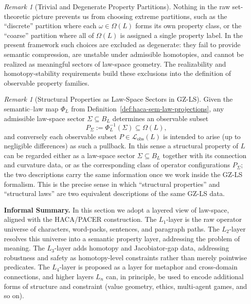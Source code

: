 \documentclass[11pt]{book}
\theoremstyle{plain}
\theoremstyle{definition}
\theoremstyle{remark}
\newtheorem{remark}[theorem]{Remark}
\begin{document}
\begin{remark}[Trivial and Degenerate Property Partitions]
\label{rem:trivial-property-partitions}
Nothing in the raw set-theoretic picture prevents us from choosing
extreme partitions, such as the ``discrete'' partition where each
$\omega\in\Omega(L)$ forms its own property class, or the ``coarse''
partition where all of $\Omega(L)$ is assigned a single property label.
In the present framework such choices are excluded as degenerate: they
fail to provide semantic compression, are unstable under admissible
homotopies, and cannot be realized as meaningful sectors of law-space
geometry. The realizability and homotopy-stability requirements build
these exclusions into the definition of observable property families.



\end{remark}

\begin{remark}[Structural Properties as Law-Space Sectors in GZ-LS]
\label{rem:structural-properties-as-laws}
Given the semantic--law map $\Phi_L$ from
Definition~\ref{def:haca-sem-law-projections}, any admissible law-space
sector $\Sigma\subseteq B_L$ determines an observable subset
\[
  P_\Sigma
  :=
  \Phi_L^{-1}(\Sigma)
  \subseteq\Omega(L),
\]
and conversely each observable subset
$P\in\mathcal{L}_{\mathrm{obs}}(L)$ is intended to arise (up to negligible
differences) as such a pullback. In this sense a structural property of
$L$ can be regarded either as a law-space sector $\Sigma\subseteq B_L$
together with its connection and curvature data, or as the corresponding
class of operator configurations $P_\Sigma$; the two descriptions carry
the same information once we work inside the GZ-LS formalism. This is the
precise sense in which ``structural properties'' and ``structural laws''
are two equivalent descriptions of the same GZ-LS data.



\end{remark}





\noindent\textbf{Informal Summary.}
In this section we adopt a layered view of law-space, aligned with the
HACA/PACER construction. The $L_1$-layer is the raw operator universe
of characters, word-packs, sentences, and paragraph paths. The $L_2$-layer
resolves this universe into a semantic property layer, addressing the
problem of meaning. The $L_3$-layer adds homotopy and Jacobiator-gap
data, addressing robustness and safety as homotopy-level constraints
rather than merely pointwise predicates. The $L_4$-layer is proposed as
a layer for metaphor and cross-domain connections, and higher layers
$L_n$ can, in principle, be used to encode additional forms of structure
and constraint (value geometry, ethics, multi-agent games, and so on).
\end{document}
